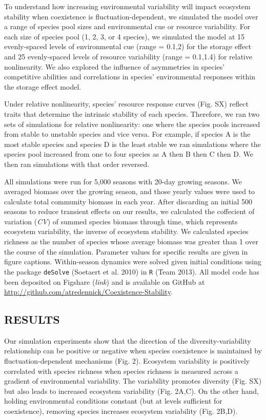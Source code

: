 \documentclass[12pt,]{article}
\begin{document}
To understand how increasing environmental variability will impact
ecosystem stability when coexistence is fluctuation-dependent, we
simulated the model over a range of species pool sizes and environmental
cue or resource variability. For each size of species pool (1, 2, 3, or
4 species), we simulated the model at 15 evenly-spaced levels of
environmental cue (range = 0.1,2) for the storage effect and 25
evenly-spaced levels of resource variability (range = 0.1,1.4) for
relative nonlinearity. We also explored the influence of asymmetries in
species' competitive abilities and correlations in species'
environmental responses within the storage effect model.

Under relative nonlinearity, species' resource response curves (Fig. SX)
reflect traits that determine the intrinsic stability of each species.
Therefore, we ran two sets of simulations for relative nonlinearity: one
where the species pools increased from stable to unstable species and
vice versa. For example, if species A is the most stable species and
species D is the least stable we ran simulations where the species pool
increased from one to four species as A then B then C then D. We then
ran simulations with that order reversed.

All simulations were run for 5,000 seasons with 20-day growing seasons.
We averaged biomass over the growing season, and those yearly values
were used to calculate total community biomass in each year. After
discarding an initial 500 seasons to reduce transient effects on our
results, we calculated the coffecient of variation (\emph{CV}) of summed
species biomass through time, which represents ecosystem variability,
the inverse of ecosystem stability. We calculated species richness as
the number of species whose average biomass was greater than 1 over the
course of the simulation. Parameter values for specific results are
given in figure captions. Within-season dynamics were solved given
initial conditions using the package \texttt{deSolve} (Soetaert et al.
2010) in \texttt{R} (Team 2013). All model code has been deposited on
Figshare (\emph{link}) and is available on GitHub at
\url{http://github.com/atredennick/Coexistence-Stability}.

\subsection{RESULTS}\label{results}

Our simulation experiments show that the direction of the
diversity-variability relationship can be positive or negative when
species coexistence is maintained by fluctuation-dependent mechanisms
(Fig. 2). Ecosystem variability is positively correlated with species
richness when species richness is measured across a gradient of
environmental variability. The variability promotes diversity (Fig. SX)
but also leads to increased ecosystem variability (Fig. 2A,C). On the
other hand, holding environmental conditions constant (but at levels
sufficient for coexistence), removing species increases ecosystem
variability (Fig. 2B,D).
\end{document}

